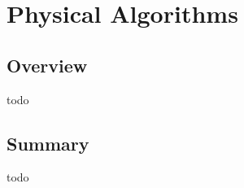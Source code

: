 \chapter{Physical Algorithms}
\label{ch:physical}

\section{Overview}
todo



\section{Summary}
todo
